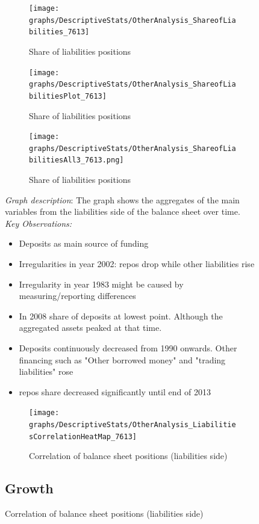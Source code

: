 \documentclass[12pt, a4paper]{article} %
\begin{document}
\begin{figure}[hbtp]
\begin{figure}[hbtp]
\centering
\caption{Share of liabilities positions}
\texttt{[image: graphs/DescriptiveStats/OtherAnalysis\_ShareofLiabilities\_7613]}
\end{figure}

\newpage

\begin{figure}[hbtp]
\centering
\caption{Share of liabilities positions}
\texttt{[image: graphs/DescriptiveStats/OtherAnalysis\_ShareofLiabilitiesPlot\_7613]}
\end{figure}
\fi

\begin{figure}[hbtp]
\centering
\caption{Share of liabilities positions}
\texttt{[image: graphs/DescriptiveStats/OtherAnalysis\_ShareofLiabilitiesAll3\_7613.png]}
\end{figure}


\noindent \textit{Graph description}: The graph shows the aggregates of the main variables from the liabilities side of the balance sheet over time.\\

\noindent \textit{Key Observations:}
\begin{itemize}
\item Deposits as main source of funding
\item Irregularities in year 2002: repos drop while other liabilities rise
\item Irregularity in year 1983 might be caused by measuring/reporting differences
\item In 2008 share of deposits at lowest point. Although the aggregated assets peaked at that time. 
\item Deposits continuously decreased from 1990 onwards. Other financing such as "Other borrowed money" and "trading liabilities" rose
\item repos share decreased significantly until end of 2013
\end{itemize}



\begin{figure}[hbtp]
\centering
\caption{Correlation of balance sheet positions (liabilities side)}
\texttt{[image: graphs/DescriptiveStats/OtherAnalysis\_LiabilitiesCorrelationHeatMap\_7613]}
\end{figure}

\newpage

\subsection{Growth}



\end{figure}
\end{document}
